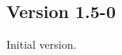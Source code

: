 \documentclass[a4paper,web]{frama-c-book}
\begin{document}
\subsection{Version 1.5-0}

Initial version.

\cleardoublepage
{}



\cleardoublepage
{}
\listoffigures

\cleardoublepage
{}
\printindex
\end{document}
